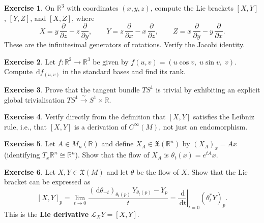 \documentclass[12pt,a4paper,openany]{book}
\theoremstyle{definition}
\newtheorem{exercise}{Exercise}[chapter]
\theoremstyle{remark}
\newcommand{\R}{\mathbb{R}}
\newcommand{\dd}{\,\mathrm{d}}
\begin{document}
\begin{exercise}\label{exo:lie-bracket-compute}
On $\R^3$ with coordinates $(x, y, z)$, compute the Lie brackets
$[X, Y]$, $[Y, Z]$, and $[X, Z]$, where
\[
  X = y\,\frac{\partial}{\partial z} - z\,\frac{\partial}{\partial y},
  \qquad
  Y = z\,\frac{\partial}{\partial x} - x\,\frac{\partial}{\partial z},
  \qquad
  Z = x\,\frac{\partial}{\partial y} - y\,\frac{\partial}{\partial x}.
\]
These are the infinitesimal generators of rotations.  Verify the Jacobi
identity.
\end{exercise}

\begin{exercise}\label{exo:df-computation}
Let $f \colon \R^2 \to \R^3$ be given by
$f(u, v) = (u\cos v,\; u\sin v,\; v)$.
Compute $\dd f_{(u,v)}$ in the standard bases and find its rank.
\end{exercise}

\begin{exercise}\label{exo:tangent-bundle-trivial}%
Prove that the tangent bundle $TS^1$ is trivial by exhibiting an explicit
global trivialisation $TS^1 \xrightarrow{\;\sim\;} S^1 \times \R$.
\end{exercise}

\begin{exercise}\label{exo:lie-bracket-leibniz}
Verify directly from the definition that $[X, Y]$ satisfies the Leibniz
rule, i.e., that $[X, Y]$ is a derivation of $C^\infty(M)$, not just
an endomorphism.
\end{exercise}

\begin{exercise}\label{exo:flow-linear}%
Let $A \in M_n(\R)$ and define $X_A \in \mathfrak{X}(\R^n)$ by
$(X_A)_x = Ax$ (identifying $T_x\R^n \cong \R^n$).  Show that the
flow of $X_A$ is $\theta_t(x) = e^{tA}x$.
\end{exercise}

\begin{exercise}\label{exo:bracket-flow}%
Let $X, Y \in \mathfrak{X}(M)$ and let $\theta$ be the flow of $X$.
Show that the Lie bracket can be expressed as
\[
  [X, Y]_p
  = \lim_{t \to 0} \frac{(\dd\theta_{-t})_{\theta_t(p)}\,
    Y_{\theta_t(p)} - Y_p}{t}
  = \left.\frac{\dd}{\dd t}\right|_{t=0}
    (\theta_t^* Y)_p.
\]
This is the \textbf{Lie derivative}
$\mathcal{L}_X Y = [X, Y]$.
\end{exercise}
\end{document}
